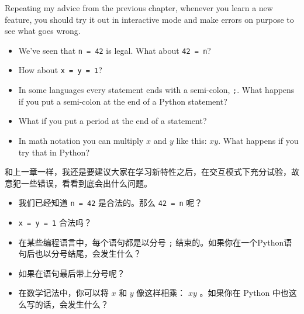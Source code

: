 \begin{exercise}

Repeating my advice from the previous chapter, whenever you learn
a new feature, you should try it out in interactive mode and make
errors on purpose to see what goes wrong.

\begin{itemize}

\item We've seen that {\tt n = 42} is legal.  What about {\tt 42 = n}?

\item How about {\tt x = y = 1}?

\item In some languages every statement ends with a semi-colon, {\tt ;}.
What happens if you put a semi-colon at the end of a Python statement?

\item What if you put a period at the end of a statement?

\item In math notation you can multiply $x$ and $y$ like this: $x y$.
What happens if you try that in Python?

\end{itemize}

和上一章一样，我还是要建议大家在学习新特性之后，在交互模式下充分试验，故意犯一些错误，看看到底会出什么问题。

\begin{itemize}

\item 我们已经知道 \lstinline{n = 42} 是合法的。那么 \lstinline{42 = n} 呢？

\item \lstinline{x = y = 1} 合法吗？

\item 在某些编程语言中，每个语句都是以分号 \lstinline{;} 结束的。如果你在一个Python语句后也以分号结尾，会发生什么？

\item 如果在语句最后带上分号呢？

\item 在数学记法中，你可以将  $x$ 和  $y$ 像这样相乘： $x y$ 。如果你在 Python 中也这么写的话，会发生什么？

\end{itemize}

\end{exercise}


